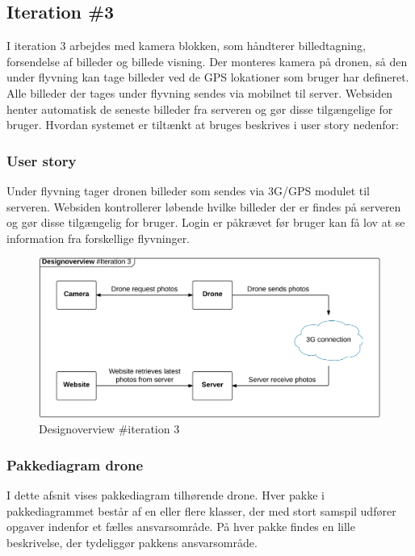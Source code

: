 \subsection{Iteration \#3}
I iteration 3 arbejdes med kamera blokken, som håndterer billedtagning, forsendelse af billeder og billede visning. Der monteres kamera på dronen, så den under flyvning kan tage billeder ved de GPS lokationer som bruger har defineret. Alle billeder der tages under flyvning sendes via mobilnet til server. Websiden henter automatisk de seneste billeder fra serveren og gør disse tilgængelige for bruger. Hvordan systemet er tiltænkt at bruges beskrives i user story nedenfor:

\subsubsection*{User story}
Under flyvning tager dronen billeder som sendes via 3G/GPS modulet til serveren. Websiden kontrollerer løbende hvilke billeder der er findes på serveren og gør disse tilgængelig for bruger. Login er påkrævet før bruger kan få lov at se information fra forskellige flyvninger.

\begin{figure}[H]
	\centering
	\includegraphics[width=1\textwidth]{Billeder/design_overview/design_overview_iteration3.png}
	\vspace{-.5cm}
	\caption{Designoverview \#iteration 3}
	\label{fig:design_overview_UC1}
\end{figure}
\newpage

\newpage
\subsubsection*{Pakkediagram drone}
I dette afsnit vises pakkediagram tilhørende drone. Hver pakke i pakkediagrammet består af en eller flere klasser, der med stort samspil udfører opgaver indenfor et fælles ansvarsområde. 
På hver pakke findes en lille beskrivelse, der tydeliggør pakkens ansvarsområde.

